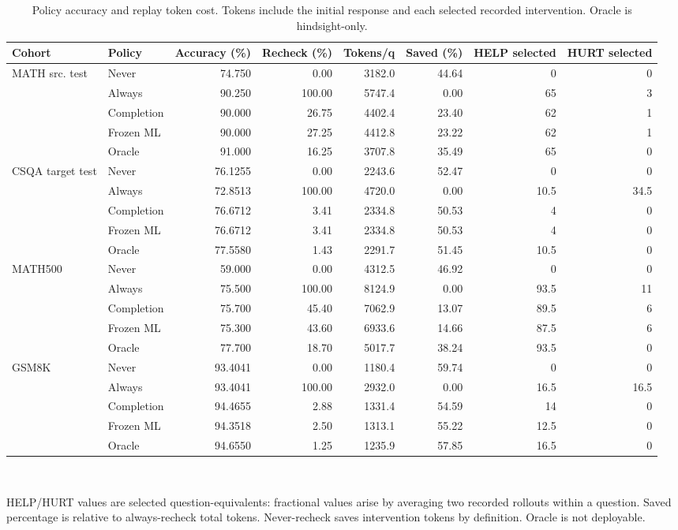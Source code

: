 \documentclass[conference]{IEEEtran}
\begin{document}
\begin{table}[t]
\caption{Policy accuracy and replay token cost. Tokens include the initial response and each selected recorded intervention. Oracle is hindsight-only.}
\label{tab:policies}
\centering\scriptsize
\begin{tabular}{llrrrrrr}
\toprule
\textbf{Cohort} & \textbf{Policy} & \textbf{Accuracy (\%)} & \textbf{Recheck (\%)} & \textbf{Tokens/q} & \textbf{Saved (\%)} & \textbf{HELP selected} & \textbf{HURT selected}\\
\midrule
MATH src. test & Never & 74.750 & 0.00 & 3182.0 & 44.64 & 0 & 0\\
 & Always & 90.250 & 100.00 & 5747.4 & 0.00 & 65 & 3\\
 & Completion & 90.000 & 26.75 & 4402.4 & 23.40 & 62 & 1\\
 & Frozen ML & 90.000 & 27.25 & 4412.8 & 23.22 & 62 & 1\\
 & Oracle & 91.000 & 16.25 & 3707.8 & 35.49 & 65 & 0\\
\midrule
CSQA target test & Never & 76.1255 & 0.00 & 2243.6 & 52.47 & 0 & 0\\
 & Always & 72.8513 & 100.00 & 4720.0 & 0.00 & 10.5 & 34.5\\
 & Completion & 76.6712 & 3.41 & 2334.8 & 50.53 & 4 & 0\\
 & Frozen ML & 76.6712 & 3.41 & 2334.8 & 50.53 & 4 & 0\\
 & Oracle & 77.5580 & 1.43 & 2291.7 & 51.45 & 10.5 & 0\\
\midrule
MATH500 & Never & 59.000 & 0.00 & 4312.5 & 46.92 & 0 & 0\\
 & Always & 75.500 & 100.00 & 8124.9 & 0.00 & 93.5 & 11\\
 & Completion & 75.700 & 45.40 & 7062.9 & 13.07 & 89.5 & 6\\
 & Frozen ML & 75.300 & 43.60 & 6933.6 & 14.66 & 87.5 & 6\\
 & Oracle & 77.700 & 18.70 & 5017.7 & 38.24 & 93.5 & 0\\
\midrule
GSM8K & Never & 93.4041 & 0.00 & 1180.4 & 59.74 & 0 & 0\\
 & Always & 93.4041 & 100.00 & 2932.0 & 0.00 & 16.5 & 16.5\\
 & Completion & 94.4655 & 2.88 & 1331.4 & 54.59 & 14 & 0\\
 & Frozen ML & 94.3518 & 2.50 & 1313.1 & 55.22 & 12.5 & 0\\
 & Oracle & 94.6550 & 1.25 & 1235.9 & 57.85 & 16.5 & 0\\
\bottomrule
\end{tabular}
\\[2pt]\parbox{\textwidth}{\scriptsize HELP/HURT values are selected question-equivalents: fractional values arise by averaging two recorded rollouts within a question. Saved percentage is relative to always-recheck total tokens. Never-recheck saves intervention tokens by definition. Oracle is not deployable.}
\end{table}
\end{document}

